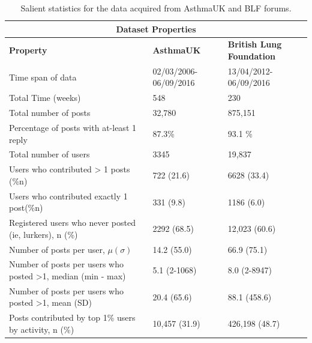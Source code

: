 \begin{table}[htb!]
\centering
\begin{tabular}{ |p{5cm}|p{5cm}|p{5cm}| }
    \hline
    \multicolumn{3}{|c|}{Dataset Properties} \\
    \hline
    \hline
     \textbf{Property} & \textbf{AsthmaUK} & \textbf{British Lung Foundation} \\
    \hline
    \hline
     Time span of data   	& 02/03/2006-06/09/2016    	& 13/04/2012-06/09/2016 \\
    \hline
     Total Time (weeks)  	& 548						& 230 \\
    \hline
     Total number of posts	& 32,780					& 875,151 \\
    \hline
     Percentage of posts with at-least 1 reply & 87.3\%			& 93.1 \% \\
    \hline
     Total number of users &	3345					& 19,837 \\
    \hline
     Users who contributed > 1 posts (\%n) & 722 (21.6)  & 6628 (33.4) \\
    \hline
     Users who contributed exactly 1 post(\%n) & 331 (9.8) & 1186 (6.0) \\
    \hline
     Registered users who never posted (ie, lurkers), n (\%) & 2292 (68.5) & 12,023 (60.6) \\
    \hline
     Number of posts per user, $\mu(\sigma)$ & 14.2 (55.0) & 66.9 (75.1) \\
    \hline
    Number of posts per users who posted >1, median (min - max) & 5.1 (2-1068) & 8.0 (2-8947) \\
    \hline 
    Number of posts per users who posted >1, mean (SD) & 20.4 (65.6) & 88.1 (458.6) \\
    \hline
    Posts contributed by top 1\% users by activity, n (\%) & 10,457 (31.9) & 426,198 (48.7) \\
    \hline 
    
    \hline
\end{tabular}
\caption{Salient statistics for the data acquired from AsthmaUK and BLF forums.}
\label{table:jmirData}
\end{table}

